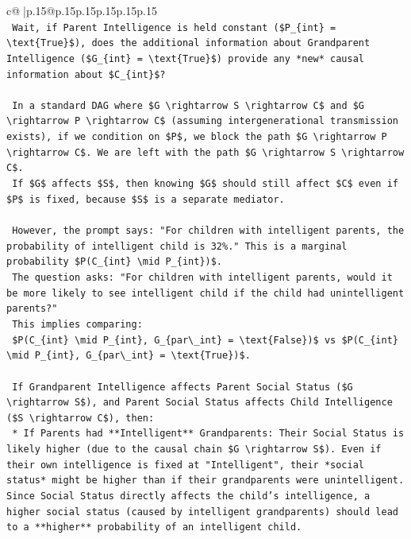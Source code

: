 \documentclass{article}
\begin{document}
{\begin{supertabular}{c@{$\;$}|p{.15\linewidth}@{}p{.15\linewidth}p{.15\linewidth}p{.15\linewidth}p{.15\linewidth}p{.15\linewidth}}
{{{\\ 
\texttt{    Wait, if Parent Intelligence is held constant (\$P\_\{int\} = \textbackslash{}text\{True\}\$), does the additional information about Grandparent Intelligence (\$G\_\{int\} = \textbackslash{}text\{True\}\$) provide any *new* causal information about \$C\_\{int\}\$?} \\
\\ 
\texttt{    In a standard DAG where \$G \textbackslash{}rightarrow S \textbackslash{}rightarrow C\$ and \$G \textbackslash{}rightarrow P \textbackslash{}rightarrow C\$ (assuming intergenerational transmission exists), if we condition on \$P\$, we block the path \$G \textbackslash{}rightarrow P \textbackslash{}rightarrow C\$. We are left with the path \$G \textbackslash{}rightarrow S \textbackslash{}rightarrow C\$.} \\
\texttt{    If \$G\$ affects \$S\$, then knowing \$G\$ should still affect \$C\$ even if \$P\$ is fixed, because \$S\$ is a separate mediator.} \\
\\ 
\texttt{    However, the prompt says: "For children with intelligent parents, the probability of intelligent child is 32\%." This is a marginal probability \$P(C\_\{int\} \textbackslash{}mid P\_\{int\})\$.} \\
\texttt{    The question asks: "For children with intelligent parents, would it be more likely to see intelligent child if the child had unintelligent parents?"} \\
\texttt{    This implies comparing:} \\
\texttt{    \$P(C\_\{int\} \textbackslash{}mid P\_\{int\}, G\_\{par\textbackslash{}\_int\} = \textbackslash{}text\{False\})\$ vs \$P(C\_\{int\} \textbackslash{}mid P\_\{int\}, G\_\{par\textbackslash{}\_int\} = \textbackslash{}text\{True\})\$.} \\
\\ 
\texttt{    If Grandparent Intelligence affects Parent Social Status (\$G \textbackslash{}rightarrow S\$), and Parent Social Status affects Child Intelligence (\$S \textbackslash{}rightarrow C\$), then:} \\
\texttt{    *   If Parents had **Intelligent** Grandparents: Their Social Status is likely higher (due to the causal chain \$G \textbackslash{}rightarrow S\$). Even if their own intelligence is fixed at "Intelligent", their *social status* might be higher than if their grandparents were unintelligent. Since Social Status directly affects the child's intelligence, a higher social status (caused by intelligent grandparents) should lead to a **higher** probability of an intelligent child.} \\
}}}
\end{supertabular}}
\end{document}
